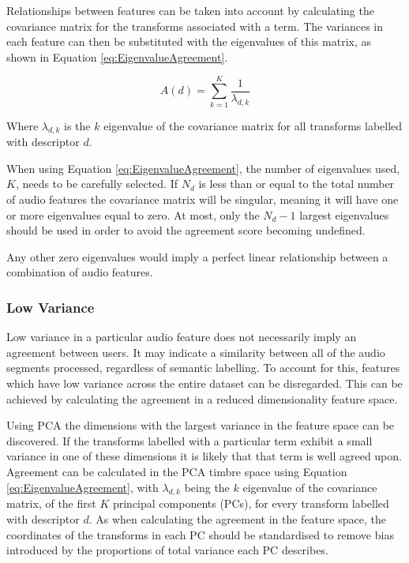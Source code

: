 			Relationships between features can be taken into account by calculating the covariance matrix for
			the transforms associated with a term. The variances in each feature can then be substituted with
			the eigenvalues of this matrix, as shown in Equation \ref{eq:EigenvalueAgreement}.

			\begin{equation}
				A(d) = \sum_{k = 1}^{K} \frac{1}{\lambda_{d,k}}
				\label{eq:EigenvalueAgreement}
			\end{equation}
			
			Where $\lambda_{d, k}$ is the $k$ eigenvalue of the covariance matrix for all transforms
			labelled with descriptor $d$.

			When using Equation \ref{eq:EigenvalueAgreement}, the number of eigenvalues used, $K$, needs to be
			carefully selected. If $N_{d}$ is less than or equal to the total number of audio features the
			covariance matrix will be singular, meaning it will have one or more eigenvalues equal to zero. At
			most, only the $N_{d} - 1$ largest eigenvalues should be used in order to avoid the agreement score
			becoming undefined.

			Any other zero eigenvalues would imply a perfect linear relationship between a combination of audio
			features. 

		\subsubsection*{Low Variance}
			Low variance in a particular audio feature does not necessarily imply an agreement between users.
			It may indicate a similarity between all of the audio segments processed, regardless of semantic
			labelling. To account for this, features which have low variance across the entire dataset can be
			disregarded. This can be achieved by calculating the agreement in a reduced dimensionality feature
			space.

			Using PCA the dimensions with the largest variance in the feature space can be discovered. If the
			transforms labelled with a particular term exhibit a small variance in one of these dimensions it
			is likely that that term is well agreed upon. Agreement can be calculated in the PCA timbre space
			using Equation \ref{eq:EigenvalueAgreement}, with $\lambda_{d,k}$ being the $k$
			eigenvalue of the covariance matrix, of the first $K$ principal components (PCs), for every
			transform labelled with descriptor $d$.  As when calculating the agreement in the feature space,
			the coordinates of the transforms in each PC should be standardised to remove bias introduced by
			the proportions of total variance each PC describes.

